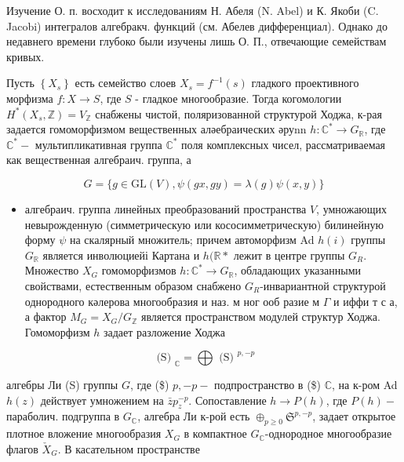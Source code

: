\documentclass[10pt]{article}
\begin{document}
Изучение О. п. восходит к исследованиям Н. Абеля (N. Abel) и К. Якоби (C. Jacobi) интегралов алгебракч. функций (см. Абелев дифференциал). Однако до недавнего времени глубоко были изучены лишь О. П., отвечающие семействам кривых.



Пусть $\left\{X_{s}\right\}$ есть семейство слоев $X_{s}=f^{-1}(s)$ гладкого проективного морфизма $f: X \rightarrow S$, где $S$ - гладкое многообразие. Тогда когомологии $H^{*}\left(X_{s}, \mathbb{Z}\right)=V_{\mathbb{Z}}$ снабжены чистой, поляризованной структурой Ходжа, к-рая задается гомоморфизмом вещественных аләебраических әруnn $h: \mathbb{C}^{*} \rightarrow G_{\mathbb{R}}$, где $\mathbb{C}^{*}-$ мультипликативная группа $\mathbb{C}^{*}$ поля комплексных чисел, рассматриваемая как вещественная алгебраич. группа, а



\[

G=\{g \in \mathrm{GL}(V), \psi(g x, g y)=\lambda(g) \psi(x, y)\}

\]



\begin{itemize}

  \item алгебраич. группа линейных преобразований пространства $V$, умножающих невырожденную (симметрическую или кососимметрическую) билинейную форму $\psi$ на скалярный множитель; причем автоморфизм Ad $h(i)$ группы $G_{\mathbb{R}}$ является инволюциейі Картана и $h(\mathbb{R} *$ лежит в центре группы $G_{R}$. Множество $X_{G}$ гомоморфизмов $h: \mathbb{C}^{*} \rightarrow G_{\mathbb{R}}$, обладающих указанными свойствами, естественным образом снабжено $G_{R}$-инвариантной структурой однородного кәлерова многообразия и наз. м ног ооб разие м $\Gamma$ и иффи т с а, а фактор $M_{G}=X_{G} / G_{\mathbb{Z}}$ является пространством модулей структур Ходжа. Гомоморфизм $h$ задает разложение Ходжа

\end{itemize}



\[

\text { (S) }_{\mathbb{C}}=\bigoplus \text { (S) }^{p,-p}

\]



алгебры Ли (S) группы $G$, где (\$) $p,-p-$ подпространство в (\$) $\mathbb{C}$, на к-ром Ad $h(z)$ действует умножением на $\bar{z} p_{z}^{-p}$. Сопоставление $h \rightarrow P(h)$, где $P(h)-$ параболич. подгруппа в $G_{\mathbb{C}}$, алгебра Ли к-рой есть $\oplus_{p \geqslant 0} \mathfrak{S}^{p,-p}$, задает открытое плотное вложение многообразия $X_{G}$ в компактное $G_{\mathbb{C}}$-однородное многообразие флагов $\check{X}_{G}$. В касательном пространстве
\end{document}
